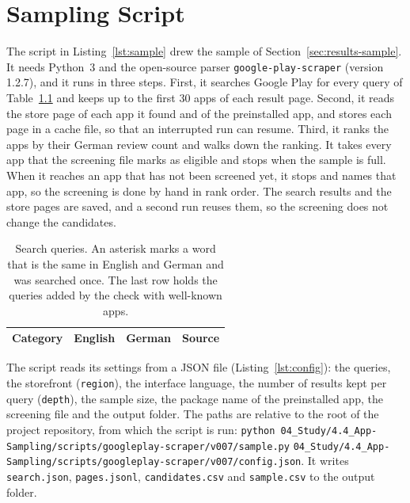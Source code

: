 \chapter{Sampling Script}
\label{app:script}
The script in Listing~\ref{lst:sample} drew the sample of
Section~\ref{sec:results-sample}. It needs Python~3 and the open-source
parser \texttt{google-play-scraper} (version 1.2.7), and it runs in three
steps. First, it searches Google Play for every query of
Table~\ref{tab:keywords} and keeps up to the first 30 apps of each result page.
Second, it reads the store page of each app it found and of the preinstalled
app, and stores each page in a cache file, so that an interrupted run can
resume. Third, it ranks the apps by their German review count and walks down
the ranking. It takes every app that the screening file marks as eligible and
stops when the sample is full. When it reaches an app that has not been
screened yet, it stops and names that app, so the screening is done by hand in
rank order. The search results and the store pages are saved, and a second run
reuses them, so the screening does not change the candidates.

\begin{table}[H]
\centering
\begin{singlespace}
\footnotesize
\caption[Search queries]{Search queries. An asterisk marks a word that is the
same in English and German and was searched once. The last row holds the
queries added by the check with well-known apps.}
\label{tab:keywords}
\begin{tabularx}{\textwidth}{@{}l>{\raggedright\arraybackslash}X>{\raggedright\arraybackslash}Xl@{}}
\toprule
\textbf{Category} & \textbf{English} & \textbf{German} & \textbf{Source} \\
\midrule
\end{tabularx}
\end{singlespace}
\end{table}

The script reads its settings from a JSON file (Listing~\ref{lst:config}):
the queries, the storefront (\texttt{region}), the interface language, the
number of results kept per query (\texttt{depth}), the sample size, the
package name of the preinstalled app, the screening file and the output
folder. The paths are relative to the root of the project repository, from
which the script is run:
\texttt{python 04\_Study/4.4\_App-Sampling/scripts/googleplay-scraper/v007/sample.py}
\texttt{04\_Study/4.4\_App-Sampling/scripts/googleplay-scraper/v007/config.json}.
It writes \texttt{search.json}, \texttt{pages.jsonl}, \texttt{candidates.csv}
and \texttt{sample.csv} to the output folder.

